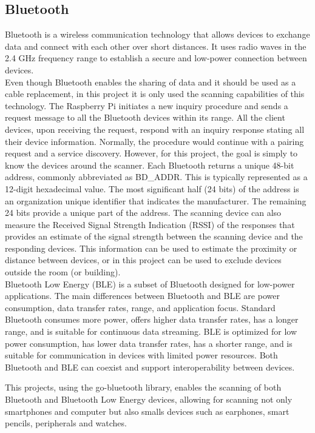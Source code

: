 \documentclass[a4paper, 11pt]{article}
\begin{document}
\subsection{Bluetooth}
Bluetooth is a wireless communication technology that allows devices to exchange data and connect with each other over short distances. It uses radio waves in the 2.4 GHz frequency range to establish a secure and low-power connection between devices.
\\
Even though Bluetooth enables the sharing of data and it should be used as a cable replacement, in this project it is only used the scanning capabilities of this technology. The Raspberry Pi initiates a new inquiry procedure and sends a request message to all the Bluetooth devices within its range. All the client devices, upon receiving the request, respond with an inquiry response stating all their device information. Normally, the procedure would continue with a pairing request and a service discovery. However, for this project, the goal is simply to know the devices around the scanner. Each Bluetooth returns a unique 48-bit address, commonly abbreviated as BD_ADDR. This is typically represented as a 12-digit hexadecimal value. The most significant half (24 bits) of the address is an organization unique identifier that indicates the manufacturer. The remaining 24 bits provide a unique part of the address. The scanning device can also measure the Received Signal Strength Indication (RSSI) of the responses that provides an estimate of the signal strength between the scanning device and the responding devices. This information can be used to estimate the proximity or distance between devices, or in this project can be used to exclude devices outside the room (or building). 
\\
Bluetooth Low Energy (BLE) is a subset of Bluetooth designed for low-power applications. The main differences between Bluetooth and BLE are power consumption, data transfer rates, range, and application focus. Standard Bluetooth consumes more power, offers higher data transfer rates, has a longer range, and is suitable for continuous data streaming. BLE is optimized for low power consumption, has lower data transfer rates, has a shorter range, and is suitable for communication in devices with limited power resources. Both Bluetooth and BLE can coexist and support interoperability between devices.

This projects, using the go-bluetooth library, enables the scanning of both Bluetooth and Bluetooth Low Energy devices, allowing for scanning not only smartphones and computer but also smalls devices such as earphones, smart pencils, peripherals and watches.
\end{document}
